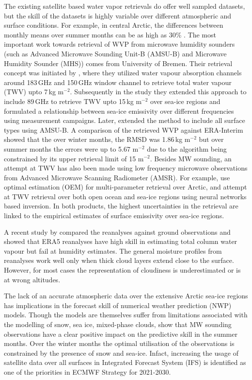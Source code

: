 \documentclass[12pt,oneside,a4paper]{article}
\begin{document}
The existing satellite based water vapor retrievals do offer well sampled datasets, but the skill of the datasets is highly variable over different atmospheric and surface conditions. For example, in central Arctic, the differences between monthly means over summer months can be as high as 30\% \citep{crewell:2021:asyst}. The most important work towards retrieval of WVP from microwave humidity sounders (such as Advanced Microwave Sounding Unit-B (AMSU-B) and Microwave
Humidity Sounder (MHS)) comes from University of Bremen. Their retrieval
concept was initiated by \citet{miao:2001:atmos}, where they utilized water
vapour absorption channels around 183\,GHz and 150\,GHz window channel to
retrieve total water vapour (TWV) upto 7\,kg m$^{-2}$. Subsequently in the
study \citep{} they extended this approach to include 89\,GHz to retrieve TWV
upto 15\,kg m$^{-2}$ over sea-ice regions and formulated a relationship between
sea-ice emissivity over different frequencies using measurement campaigns.
Later, \cite{scarlat:2018:retri} extended the method to include all surface
types using AMSU-B. A comparison of the retrieved WVP against ERA-Interim
showed that the over winter months, the RMSD was 1.86\,kg m$^{-2}$ but over
summer months the errors were up to 5.67 m$^{-2}$ due to the algorithm being
constrained by its upper retrieval limit of 15 m$^{-2}$. Besides MW sounding,
an attempt at TWV has also been made using low frequency microwave observations
from Advanced Microwave Scanning Radiometer (AMSR). For example,
\citet{scarlat:2017:exper} use optimal estimation (OEM) for multi-parameter
retrieval over Arctic, and \citet{zabolotskikh:2020:anadv} attempt at TWV
retrieval over both open ocean and sea-ice regions using neural networks based
inversion. In both products, the highest uncertainties in the retrieval are
linked to the empirical estimates of surface emissivity over sea-ice regions.

A recent study by \citet{graham:2019:evalu} compared the reanalyses against ground observations and showed that ERA5 reanalyses have high skill in estimating total column water vapour but fail at humidity estimates. The general moisture profiles from reanalyses work well only when thick cloud layers extend close to the surface. However, for most cases the representation of cloudiness is underestimated or is at wrong altitudes.
 
The lack of an accurate atmospheric data over the extensive Arctic sea-ice regions has implications in the forecast skill of numerical weather prediction (NWP) models. Though the  models are themselves suffer from limitations associated with the modelling of snow, sea ice, mixed-phase clouds, \citet{lawrence:2019:usean} show that MW sounding observations have a clear positive impact on the predictive skill in the summer months. Over the winter months the optimal utilisation of the observations is constrained by the presence of snow and sea-ice. Infact,  increasing the usage of satellite data over all surfaces in Integrated Forecast System (IFS) is identified as one of the priorities in ECMWF Strategy for 2021-2030. 
\end{document}
